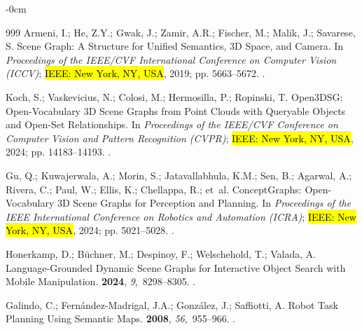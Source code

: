 \documentclass[electronics,article,accept,pdftex,moreauthors]{Definitions/mdpi}
\begin{document}
\begin{adjustwidth}{-\extralength}{0cm}
\begin{thebibliography}{999}
Armeni, I.; He, Z.Y.; Gwak, J.; Zamir, A.R.; Fischer, M.; Malik, J.; Savarese,
  S.
 Scene Graph: A Structure for Unified Semantics, 3{D} Space, and
  Camera.
\newblock In \textit{Proceedings of the IEEE/CVF International Conference on Computer Vision (ICCV)}; \hl{IEEE: New York, NY, USA},
  2019; pp. 5663--5672.
.

Koch, S.; Vaskevicius, N.; Colosi, M.; Hermosilla, P.; Ropinski, T.
\newblock Open3{DSG}: Open-Vocabulary 3{D} Scene Graphs from Point Clouds with
  Queryable Objects and Open-Set Relationships.
\newblock In \textit{Proceedings of the IEEE/CVF Conference on Computer Vision and Pattern
  Recognition (CVPR)}; \hl{IEEE: New York, NY, USA},  2024; pp. 14183--14193.
.

Gu, Q.; Kuwajerwala, A.; Morin, S.; Jatavallabhula, K.M.; Sen, B.; Agarwal, A.;
  Rivera, C.; Paul, W.; Ellis, K.; Chellappa, R.;  et~al.
\newblock Concept{G}raphs: Open-Vocabulary 3{D} Scene Graphs for Perception and
  Planning.
\newblock In \textit{Proceedings of the IEEE International Conference on Robotics and Automation
  (ICRA)}; \hl{IEEE: New York, NY, USA},  2024; pp. 5021--5028.
.

Honerkamp, D.; B{\"u}chner, M.; Despinoy, F.; Welschehold, T.; Valada, A.
\newblock Language-Grounded Dynamic Scene Graphs for Interactive Object Search
  with Mobile Manipulation.
 {\bf 2024}, {\em
  9},~8298--8305.
.

Galindo, C.; Fern{\'a}ndez-Madrigal, J.A.; Gonz{\'a}lez, J.; Saffiotti, A.
\newblock Robot Task Planning Using Semantic Maps.
 {\bf 2008}, {\em 56},~955--966.
.


\end{thebibliography}
\end{adjustwidth}
\end{document}

